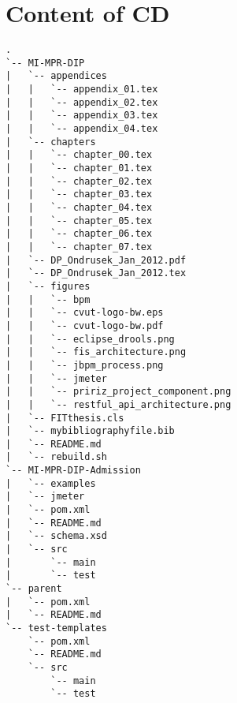 \chapter{Content of CD}\label{app:CDcontent}

\begin{verbatim}
.
`-- MI-MPR-DIP
|   `-- appendices
|   |   `-- appendix_01.tex
|   |   `-- appendix_02.tex
|   |   `-- appendix_03.tex
|   |   `-- appendix_04.tex
|   `-- chapters
|   |   `-- chapter_00.tex
|   |   `-- chapter_01.tex
|   |   `-- chapter_02.tex
|   |   `-- chapter_03.tex
|   |   `-- chapter_04.tex
|   |   `-- chapter_05.tex
|   |   `-- chapter_06.tex
|   |   `-- chapter_07.tex
|   `-- DP_Ondrusek_Jan_2012.pdf
|   `-- DP_Ondrusek_Jan_2012.tex
|   `-- figures
|   |   `-- bpm
|   |   `-- cvut-logo-bw.eps
|   |   `-- cvut-logo-bw.pdf
|   |   `-- eclipse_drools.png
|   |   `-- fis_architecture.png
|   |   `-- jbpm_process.png
|   |   `-- jmeter
|   |   `-- pririz_project_component.png
|   |   `-- restful_api_architecture.png
|   `-- FITthesis.cls
|   `-- mybibliographyfile.bib
|   `-- README.md
|   `-- rebuild.sh
`-- MI-MPR-DIP-Admission
|   `-- examples
|   `-- jmeter
|   `-- pom.xml
|   `-- README.md
|   `-- schema.xsd
|   `-- src
|       `-- main
|       `-- test
`-- parent
|   `-- pom.xml
|   `-- README.md
`-- test-templates
    `-- pom.xml
    `-- README.md
    `-- src
        `-- main
        `-- test
\end{verbatim}